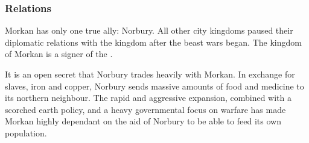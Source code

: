 \subsubsection{Relations}

Morkan has only one true ally: Norbury. All other city kingdoms paused their
diplomatic relations with the kingdom after the beast wars began.  The kingdom
of Morkan is a signer of the .

It is an open secret that Norbury trades heavily with Morkan. In exchange for
slaves, iron and copper, Norbury sends massive amounts of food and medicine to
its northern neighbour. The rapid and aggressive expansion, combined with a
scorched earth policy, and a heavy governmental focus on warfare has made
Morkan highly dependant on the aid of Norbury to be able to feed its own
population.
